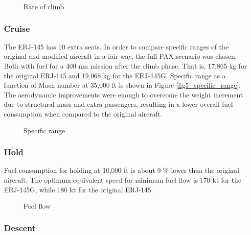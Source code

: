 \begin{figure}[H] %
\caption{Rate of climb}
\label{fig:fig4_rate_of_climb}
\end{figure}

\subsubsection{Cruise}

The ERJ-145 has 10 extra seats. In order to compare specific ranges of the original and modified aircraft in a fair way, the full PAX scenario was chosen. Both with fuel for a 400 nm mission after the climb phase. That is, 17,865 kg for the original ERJ-145 and 19,068 kg for the ERJ-145G. Specific range as a function of Mach number at 35,000 ft is shown in Figure \ref{fig5_specific_range}. The aerodynamic improvements were enough to overcome the weight increment due to structural mass and extra passengers, resulting in a lower overall fuel consumption when compared to the original aircraft.

\begin{figure}[H] %
\caption{Specific range}
\label{fig:fig5_specific_range}
\end{figure}

\subsubsection{Hold}

Fuel consumption for holding at 10,000 ft is about 9 \% lower than the original aircraft. The optimum equivalent speed for minimum fuel flow is 170 kt for the ERJ-145G, while 180 kt for the original ERJ-145.

\begin{figure}[H] %
\caption{Fuel flow}
\label{fig:fig6_fuel_flow_copy}
\end{figure}

\subsubsection{Descent}

